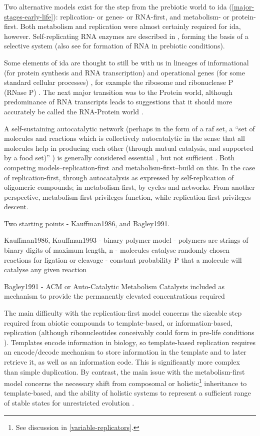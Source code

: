 Two alternative models exist for the step from the prebiotic world  to \gls{ida} (\cref{major-stages-early-life}): replication- or genes- or RNA-first, and metabolism- or protein-first. Both metabolism and replication were almost certainly required for \gls{ida}, however. Self-replicating RNA enzymes are described in \textcite{Lincoln2009}, forming the basis of a selective system (also see \textcite{Cheng2010,Powner2009} for formation of RNA in prebiotic conditions). 

Some elements of \gls{ida}  are thought to still be with us in lineages of informational (for protein synthesis and RNA transcription) and operational genes (for some standard cellular processes) \parencite{Ragan2009}, for example the ribosome and ribonuclease P (RNase P) \parencite{Wilson2009}. The next major transition was to the Protein world, although predominance of RNA transcripts leads to suggestions that it should more accurately be called the RNA-Protein world \parencite{Altman2013}. 

A self-sustaining autocatalytic network (perhaps in the form of a \gls{raf} set, a ``set of molecules and reactions which is collectively autocatalytic in the sense that all molecules help in producing each other (through mutual catalysis, and supported by a food set)'' \parencite{Hordijk2011}) is generally considered essential \parencite{Pross2013}, but not sufficient \parencite{Hordijk2011}. Both competing models--replication-first and metabolism-first--build on this. In the case of replication-first, through autocatalysis as expressed by self-replication of oligomeric compounds; in metabolism-first, by cycles and networks. From another perspective, metabolism-first privileges function, while replication-first privileges descent.

Two starting points - Kauffman1986, and Bagley1991.

Kauffman1986, Kauffman1993
- binary polymer model
- polymers are strings of binary digits of maximum length, n
- molecules catalyse randomly chosen reactions for ligation or cleavage
- constant probability P that a molecule will catalyse any given reaction

Bagley1991 - ACM or Auto-Catalytic Metabolism
Catalysts included as mechanism to provide the permanently elevated concentrations required

The main difficulty with the replication-first model concerns the sizeable step required from abiotic compounds to template-based, or information-based, replication (although ribonucleotides conceivably could form in pre-life conditions \parencite{Powner2009}). Templates encode information in biology, so template-based replication requires an encode/decode mechanism to store information in the template and to later retrieve it, as well as an information code. This is significantly more complex than simple duplication. By contrast, the main issue with the metabolism-first model concerns the necessary shift from composomal or holistic\footnote{See discussion in \cref{variable-replicators}.} inheritance to template-based, and the ability of holistic systems to represent a sufficient range of stable states for unrestricted evolution \parencite{Vasas2010}.

